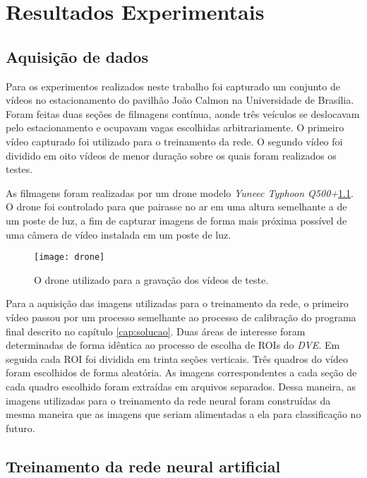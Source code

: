 \chapter{Resultados Experimentais}\label{cap:results}

\section{Aquisição de dados}

Para os experimentos realizados neste trabalho foi capturado um conjunto de vídeos no estacionamento do pavilhão João Calmon na Universidade de Brasília. Foram feitas duas seções de filmagens contínua, aonde três veículos se deslocavam pelo estacionamento e ocupavam vagas escolhidas arbitrariamente. O primeiro vídeo capturado foi utilizado para o treinamento da rede. O segundo vídeo foi dividido em oito vídeos de menor duração sobre os quais foram realizados os testes.

As filmagens foram realizadas por um drone modelo \textit{Yuneec Typhoon Q500+}\ref{fig:drone}. O drone foi controlado para que pairasse no ar em uma altura semelhante a de um poste de luz, a fim de capturar imagens de forma mais próxima possível de uma câmera de vídeo instalada em um poste de luz.

\begin{figure}
\centering
\texttt{[image: drone]}
\label{fig:drone}
\caption{O drone utilizado para a gravação dos vídeos de teste.}
\centering
\end{figure}

Para a aquisição das imagens utilizadas para o treinamento da rede, o primeiro vídeo passou por um processo semelhante ao processo de calibração do programa final descrito no capítulo \ref{cap:solucao}. Duas áreas de interesse foram determinadas de forma idêntica ao processo de escolha de ROIs do \textit{DVE}. Em seguida cada ROI foi dividida em trinta seções verticais. Três quadros do vídeo foram escolhidos de forma aleatória. As imagens correspondentes a cada seção de cada quadro escolhido foram extraídas em arquivos separados. Dessa maneira, as imagens utilizadas para o treinamento da rede neural foram construídas da mesma maneira que as imagens que seriam alimentadas a ela para classificação no futuro.

\section{Treinamento da rede neural artificial}

